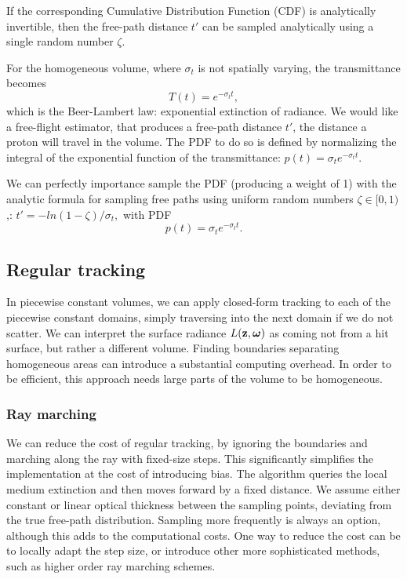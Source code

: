If the corresponding Cumulative Distribution Function (CDF) is analytically invertible, then the free-path distance $t'$ can be sampled analytically using a single random number $\zeta$.

For the homogeneous volume, where $\sigma_t$ is not spatially varying, the transmittance becomes
$$
T(t) = e^{-\sigma_t t},
$$
which is the Beer-Lambert law: exponential extinction of radiance. We would like a free-flight estimator, that produces a free-path distance $t'$, the distance a proton will travel in the volume. The PDF to do so is defined by normalizing the integral of the exponential function of the transmittance:
$
p(t) = \sigma_t e^{-\sigma_t t}.
$

\noindent We can perfectly importance sample the PDF (producing a weight of 1) with the analytic formula for sampling free paths using uniform random numbers $\zeta \in [0,1)$,\cite{PharrHumphrey2016}:
$
t' = - ln(1 - \zeta)/\sigma_t,   
$
with PDF 
\begin{equation}\label{eq:mc-pdf}
p(t) = \sigma_t e^{-\sigma_t t}.
\end{equation}

\subsection{Regular tracking}
In piecewise constant volumes, we can apply closed-form tracking to each of the piecewise constant domains, simply traversing into the next domain if we do not scatter. We can interpret the surface radiance $L(\textbf{z}, \boldsymbol{\omega})$ as coming not from a hit surface, but rather a different volume. Finding boundaries separating homogeneous areas can introduce a substantial computing overhead. In order to be efficient, this approach needs large parts of the volume to be homogeneous. 

\subsubsection{Ray marching}
We can reduce the cost of regular tracking, by ignoring the boundaries and marching along the ray with fixed-size steps. This significantly simplifies the implementation at the cost of introducing bias. The algorithm queries the local medium extinction and then moves forward by a fixed distance. We assume either constant or linear optical thickness between the sampling points, deviating from the true free-path distribution. Sampling more frequently is always an option, although this adds to the computational costs. One way to reduce the cost can be to locally adapt the step size, or introduce other more sophisticated methods, such as higher order ray marching schemes\cite{Munoz14}. 

